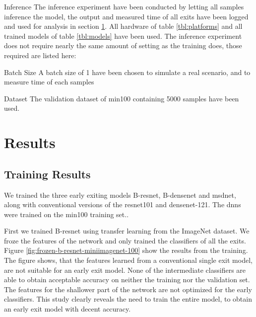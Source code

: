 \begin{enumdescript}
	\item[Inference] The inference experiment have been conducted by letting all samples inference the model, the output and measured time of all exits have been logged and used for analysis in section \ref{sec:ee-results}. All hardware of table \ref{tbl:platforms} and all trained models of table \ref{tbl:models} have been used. The inference experiment does not require nearly the same amount of setting as the training does, those required are listed here:
	\begin{enumdescript}
		\item[Batch Size] A batch size of 1 have been chosen to simulate a real scenario, and to measure time of each samples
		\item[Dataset] The validation dataset of \gls{min100} containing 5000 samples have been used.
	\end{enumdescript} 
	
\end{enumdescript}

\section{Results} \label{sec:ee-results}

\subsection{Training Results}

We trained the three early exiting models B-\gls{resnet}, B-\gls{densenet} and \gls{msdnet}, along with conventional versions of the \gls{resnet}101 and \gls{densenet}-121. The \gls{dnn}s were trained on the \gls{min100} training set..

First we trained B-\gls{resnet} using transfer learning from the ImageNet dataset. We froze the features of the network and only trained the classifiers of all the exits. Figure \ref{fig:frozen-b-resnet-miniimagenet-100} show the results from the training. The figure shows, that the features learned from a conventional single exit model, are not suitable for an early exit model. None of the intermediate classifiers are able to obtain acceptable accuracy on neither the training nor the validation set. The features for the shallower part of the network are not optimized for the early classifiers. This study clearly reveals the need to train the entire model, to obtain an early exit model with decent accuracy.  

